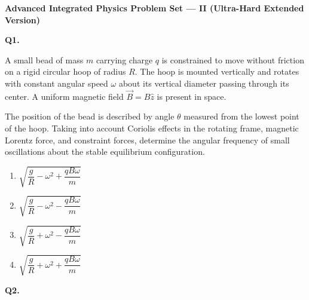 \documentclass[12pt]{article}
\begin{document}
\begin{center}
\Large \textbf{Advanced Integrated Physics Problem Set — II (Ultra-Hard Extended Version)}
\end{center}

\bigskip

\textbf{Q1.}

A small bead of mass $m$ carrying charge $q$ is constrained to move without friction on a rigid circular hoop of radius $R$. The hoop is mounted vertically and rotates with constant angular speed $\omega$ about its vertical diameter passing through its center. A uniform magnetic field $ \vec B = B\hat z $ is present in space.

The position of the bead is described by angle $\theta$ measured from the lowest point of the hoop. Taking into account Coriolis effects in the rotating frame, magnetic Lorentz force, and constraint forces, determine the angular frequency of small oscillations about the stable equilibrium configuration.

\begin{center}
\end{center}

\begin{enumerate}
\item[(A)] $\sqrt{\dfrac{g}{R}-\omega^2+\dfrac{qB\omega}{m}}$
\item[(B)] $\sqrt{\dfrac{g}{R}-\omega^2-\dfrac{qB\omega}{m}}$
\item[(C)] $\sqrt{\dfrac{g}{R}+\omega^2-\dfrac{qB\omega}{m}}$
\item[(D)] $\sqrt{\dfrac{g}{R}+\omega^2+\dfrac{qB\omega}{m}}$
\end{enumerate}

\bigskip

\textbf{Q2.}
\end{document}
